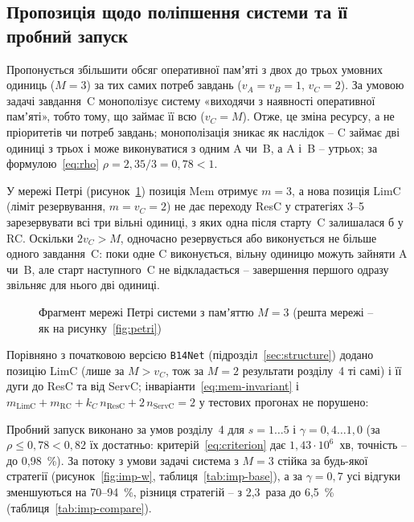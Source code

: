 \subsection{Пропозиція щодо поліпшення системи та її пробний запуск}\label{sec:improvement}

Пропонується збільшити обсяг оперативної памʼяті з двох до трьох умовних одиниць ($M = 3$) за
тих самих потреб завдань ($v_A = v_B = 1$, \mbox{$v_C = 2$}). За умовою задачі завдання~C монополізує
систему «виходячи з наявності оперативної памʼяті», тобто тому, що займає її всю ($v_C = M$).
Отже, це зміна ресурсу, а не пріоритетів чи потреб завдань; монополізація зникає як наслідок --
C займає дві одиниці з трьох і може виконуватися з одним A чи~B, а A і~B -- утрьох; за
формулою~\eqref{eq:rho} $\rho = 2{,}35/3 = 0{,}78 < 1$.

У мережі Петрі (рисунок~\ref{fig:limc}) позиція Mem отримує $m = 3$, а нова позиція LimC
(ліміт резервування, $m = v_C = 2$) не дає переходу ResC у стратегіях 3--5 зарезервувати всі
три вільні одиниці, з яких одна після старту~C залишалася б у RC. Оскільки $2v_C > M$,
одночасно резервується або виконується не більше одного завдання~C: поки одне C виконується,
вільну одиницю можуть зайняти A чи~B, але старт наступного~C не відкладається -- завершення
першого одразу звільняє для нього дві одиниці.

\begin{figure}
  \centering
  
  \caption{Фрагмент мережі Петрі системи з памʼяттю $M = 3$ (решта мережі -- як на
    рисунку~\ref{fig:petri})}
  \label{fig:limc}
\end{figure}

Порівняно з початковою версією \texttt{B14Net} (підрозділ~\ref{sec:structure}) додано позицію
LimC (лише за $M > v_C$, тож за $M = 2$ результати розділу~4 ті самі) і її дуги до ResC та від
ServC; інваріанти~\eqref{eq:mem-invariant} і $m_{\text{LimC}} + m_{\text{RC}} + k_C\,n_{\text{ResC}} +
2\,n_{\text{ServC}} = 2$ у тестових прогонах не порушено:
\medskip
{}
\medskip
{}

Пробний запуск виконано за умов розділу~4 для $s = 1\ldots5$ і $\gamma = 0{,}4\ldots1{,}0$
(за $\rho \le 0{,}78 < 0{,}82$ їх достатньо: критерій~\eqref{eq:criterion} дає $1{,}43\cdot10^6$~хв,
точність -- до 0,98~\%). За потоку з умови задачі система з $M = 3$ стійка за будь-якої стратегії
(рисунок~\ref{fig:imp-w}, таблиця~\ref{tab:imp-base}), а за $\gamma = 0{,}7$ усі відгуки
зменшуються на 70--94~\%, різниця стратегій -- з 2,3~раза до 6,5~\% (таблиця~\ref{tab:imp-compare}).

